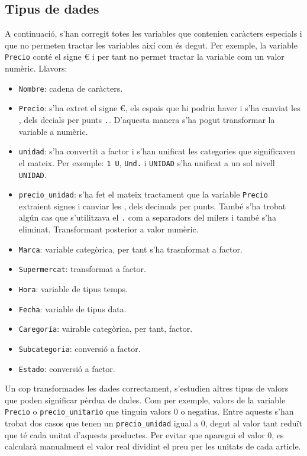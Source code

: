 \documentclass[
]{article}
\providecommand{\tightlist}{%
  \setlength{\itemsep}{0pt}\setlength{\parskip}{0pt}}
\begin{document}
\hypertarget{tipus-de-dades}{%
\subsection{Tipus de dades}\label{tipus-de-dades}}

A continuació, s'han corregit totes les variables que contenien
caràcters especials i que no permeten tractar les variables així com és
degut. Per exemple, la variable \texttt{Precio} conté el signe € i per
tant no permet tractar la variable com un valor numèric. Llavors:

\begin{itemize}
\tightlist
\item
  \texttt{Nombre}: cadena de caràcters.
\item
  \texttt{Precio}: s'ha extret el signe €, els espais que hi podria
  haver i s'ha canviat les , dels decials per punts \texttt{.}.
  D'aquesta manera s'ha pogut transformar la variable a numèric.
\item
  \texttt{unidad}: s'ha convertit a factor i s'han unificat les
  categories que significaven el mateix. Per exemple: \texttt{1\ U},
  \texttt{Und.} i \texttt{UNIDAD} s'ha unificat a un sol nivell
  \texttt{UNIDAD}.
\item
  \texttt{precio\_unidad}: s'ha fet el mateix tractament que la variable
  \texttt{Precio} extraient signes i canviar les , dels decimals per
  punts. També s'ha trobat algún cas que s'utilitzava el \texttt{.} com
  a separadors del milers i també s'ha eliminat. Transformant posterior
  a valor numèric.
\item
  \texttt{Marca}: variable categòrica, per tant s'ha trasnformat a
  factor.
\item
  \texttt{Supermercat}: transformat a factor.
\item
  \texttt{Hora}: variable de tipus temps.
\item
  \texttt{Fecha}: variable de tipus data.
\item
  \texttt{Caregoría}: vairable categòrica, per tant, factor.
\item
  \texttt{Subcategoria}: conversió a factor.
\item
  \texttt{Estado}: conversió a factor.
\end{itemize}

Un cop transformades les dades correctament, s'estudien altres tipus de
valors que poden significar pèrdua de dades. Com per exemple, valors de
la variable \texttt{Precio} o \texttt{precio\_unitario} que tinguin
valors 0 o negatius. Entre aquests s'han trobat dos casos que tenen un
\texttt{precio\_unidad} igual a 0, degut al valor tant reduït que té
cada unitat d'aquests productes. Per evitar que aparegui el valor 0, es
calcularà manualment el valor real dividint el preu per les unitats de
cada article.
\end{document}
